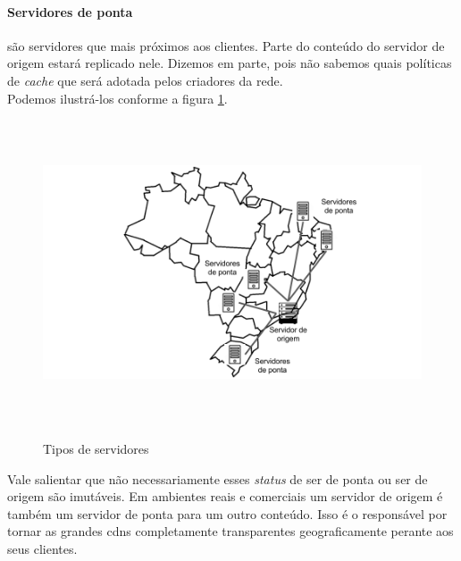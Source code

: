 \paragraph{Servidores de ponta}s\~ao servidores que mais pr\'oximos aos clientes. Parte do conte\'udo do servidor de origem estar\'a replicado nele. Dizemos em parte, pois n\~ao sabemos quais pol\'iticas de \textit{cache} que ser\'a adotada pelos criadores da rede. 
\\
Podemos ilustr\'a-los conforme a figura \ref{figura:tipos_servidores}.
\begin{figure}[H]
\caption{Tipos de servidores}
\includegraphics[height=9cm]{Figuras/tipos_servidores.png} 
\label{figura:tipos_servidores} 
\end{figure}

Vale salientar que n\~ao necessariamente esses \textit{status} de ser de ponta ou ser de origem s\~ao imut\'aveis. Em ambientes reais e comerciais um servidor de origem \'e tamb\'em um servidor de ponta para um outro conte\'udo. Isso \'e o respons\'avel por tornar as grandes cdns completamente transparentes geograficamente perante aos seus clientes.